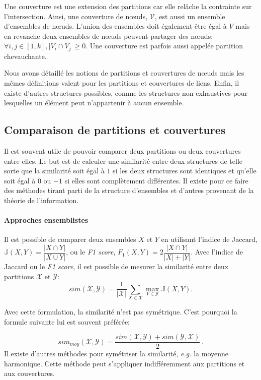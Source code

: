 Une couverture est une extension des partitions car elle relâche la contrainte sur l'intersection.
Ainsi, une couverture de n\oe{}uds, $\mathcal{V}$, est aussi un ensemble d'ensembles de n\oe{}uds.
L'union des ensembles doit également être égal à $V$ mais en revanche deux ensembles de n\oe{}uds peuvent partager des n\oe{}uds: $\forall i,j \in [1,k], |V_i \cap V_j\ \geq 0$.
Une couverture est parfois aussi appelée partition chevauchante.

Nous avons détaillé les notions de partitions et couvertures de n\oe{}uds mais les mêmes définitions valent pour les partitions et couvertures de liens.
Enfin, il existe d'autres structures possibles, comme les structures non-exhaustives pour lesquelles un élément peut n'appartenir à aucun ensemble.

\subsection{Comparaison de partitions et couvertures}
Il est souvent utile de pouvoir comparer deux partitions ou deux couvertures entre elles.
Le but est de calculer une similarité entre deux structures de telle sorte que la similarité soit égal à $1$ si les deux structures sont identiques et qu'elle soit égal à $0$ ou $-1$ si elles sont complètement différentes.
Il existe pour ce faire des méthodes tirant parti de la structure d'ensembles et d'autres provenant de la théorie de l'information.

\paragraph{Approches ensemblistes}
\label{def:graphe_comparaison}
Il est possible de comparer deux ensembles $X$ et $Y$ en utilisant l'indice de Jaccard, $\mathbb{J}(X,Y) = \dfrac{|X \cap Y|}{|X \cup Y|}$, ou le \emph{F1 score}, $F_1(X,Y) = 2\dfrac{|X \cap Y|}{|X| + |Y|}$.
Avec l'indice de Jaccard ou le \emph{F1 score}, il est possible de mesurer la similarité entre deux partitions $\mathcal{X}$ et $\mathcal{Y}$:
\begin{equation}
sim(\mathcal{X},\mathcal{Y})=\frac{1}{|\mathcal{X}|}\sum_{X \in \mathcal{X}}\max_{Y\in \mathcal{Y}}\mathbb{J}(X,Y).
\end{equation}

Avec cette formulation, la similarité n'est pas symétrique.
C'est pourquoi la formule suivante lui est souvent préférée:

\begin{equation}
sim_{moy}(\mathcal{X},\mathcal{Y}) = \dfrac{sim(\mathcal{X},\mathcal{Y})+sim(\mathcal{Y},\mathcal{X})}{2}\,.
\end{equation}
Il existe d'autres méthodes pour symétriser la similarité, \emph{e.g.} la moyenne harmonique.
Cette méthode peut s'appliquer indifféremment aux partitions et aux couvertures.

